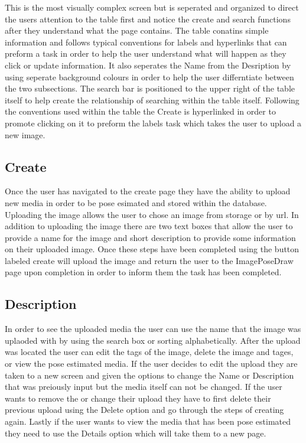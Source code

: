 \documentclass{scrreprt}
\begin{document}
This is the most visually complex screen but is seperated and organized to direct the users attention to the table first and notice the create and search functions after they understand what the page contains. The table conatins simple information and follows typical conventions for labels and hyperlinks that can preform a task in order to help the user understand what will happen as they click or update information. It also seperates the Name from the Desription by using seperate background colours in order to help the user differntiate between the two subsections. The search bar is positioned to the upper right of the table itself to help create the relationship of searching within the table itself. Following the conventions used within the table the Create is hyperlinked in order to promote clicking on it to preform the labels task which takes the user to upload a new image. 

\subsection{Create}
Once the user has navigated to the create page they have the ability to upload new media in order to be pose esimated and stored within the database. Uploading the image allows the user to chose an image from storage or by url. In addition to uploading the image there are two text boxes that allow the user to provide a name for the image and short description to provide some information on their uploaded image. Once these steps have been completed using the button labeled create will upload the image and return the user to the ImagePoseDraw page upon completion in order to inform them the task has been completed.

\subsection{Description}
In order to see the uploaded media the user can use the name that the image was uplaoded with by using the search box or sorting alphabetically. After the upload was located the user can edit the tags of the image, delete the image and tages, or view the pose estimated media. If the user decides to edit the upload they are taken to a new screen and given the options to change the Name or Description that was preiously input but the media itself can not be changed. If the user wants to remove the or change their upload they have to first delete their previous upload using the Delete option and go through the steps of creating again. Lastly if the user wants to view the media that has been pose estimated they need to use the Details option which will take them to a new page.
\end{document}
